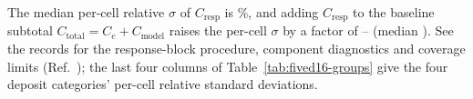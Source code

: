 
The median per-cell relative $\sigma$ of $C_{\mathrm{resp}}$ is \%, and adding $C_{\mathrm{resp}}$ to the baseline subtotal $C_{\mathrm{total}}=C_e+C_{\mathrm{model}}$ raises the per-cell $\sigma$ by a factor of -- (median ). See the records for the response-block procedure, component diagnostics and coverage limits (Ref.~\cite{NoteRecords2026}); the last four columns of Table~\ref{tab:fived16-groups} give the four deposit categories' per-cell relative standard deviations.

